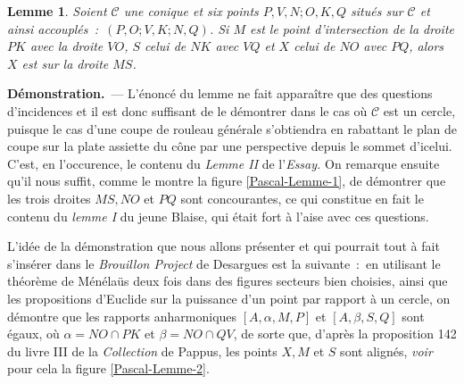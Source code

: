 \documentclass[12pt, a4paper]{article}
\newcommand{\cC}{\mathcal{C}}
\newtheorem{lemme}{\noindent \textbf{Lemme}}[section]
\newenvironment{demonstration}{\begin{trivlist}\item[]{\textbf{D\'emonstration.}}~---}%
{\nolinebreak  \end{trivlist}}
\begin{document}
\begin{lemme} Soient $\cC$ une conique et six points $P,V,N;O,K,Q$ situés sur $\cC$ et ainsi accouplés~:~$(P,O;V,K;N,Q)$. Si $M$ est le point d'intersection de la droite $PK$ avec la droite $VO$, $S$ celui de $NK$ avec $VQ$ et $X$ celui de $NO$ avec $PQ$, alors $X$ est sur la droite $MS$. 
\end{lemme}
\begin{demonstration} L'énoncé du lemme ne fait apparaître que des questions d'incidences et il est donc suffisant de le démontrer dans le cas où $\cC$ est un cercle, puisque le cas d'une coupe de rouleau générale s'obtiendra en rabattant le plan de coupe sur la plate assiette du cône par une perspective depuis le sommet d'icelui. C'est, en l'occurence, le contenu du \textit{Lemme II} de l'\textit{Essay.} On remarque ensuite qu'il nous suffit, comme le montre la figure \ref{Pascal-Lemme-1}, de démontrer que les trois droites $MS,NO$ et $PQ$ sont concourantes, ce qui constitue en fait le contenu du \textit{lemme I} du jeune Blaise, qui était fort à l'aise avec ces questions. 

L'idée de la démonstration que nous allons présenter et qui pourrait tout à fait s'insérer dans le \textit{Brouillon Project} de Desargues est la suivante~:~en utilisant le théorème de Ménélaüs deux fois dans des figures secteurs bien choisies, ainsi que les propositions d'Euclide sur la puissance d'un point par rapport à un cercle, on démontre que les rapports anharmoniques $[A,\alpha,M,P]$ et $[A,\beta,S,Q]$ sont égaux, où $\alpha=NO\cap PK$ et $\beta=NO\cap QV$, de sorte que, d'après la proposition 142 du livre III de la \textit{Collection} de Pappus, les points $X,M$ et $S$ sont alignés, \textit{voir} pour cela la figure \ref{Pascal-Lemme-2}.


\end{demonstration}
\end{document}
